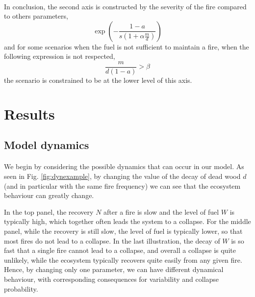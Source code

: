 \documentclass{article}
\begin{document}
\paragraph{}
In conclusion, the second axis is constructed by the severity of the fire compared to others parameters, 
\[
\exp(-\frac{1-a}{s(1+\alpha\frac{m}{d})})
\]
and for some scenarios when the fuel is not sufficient to maintain a fire, when the following expression is not respected,
\[
\frac{m}{d( 1-a)} > \beta
\]
the scenario is constrained to be at the lower level of this axis.

\newpage

\section{Results}

\subsection{Model dynamics}




\paragraph{}
We begin by considering the possible dynamics that can occur in our model. As seen in Fig. \ref{fig:dynexample}, by changing the value of the decay of dead wood $d$ (and in particular with the same fire frequency) we can see that the ecosystem behaviour can greatly change.

In the top panel, the recovery $N$ after a fire is slow and the level of fuel $W$ is typically high, which together often leads the system to a collapse. For the middle panel, while the recovery is still slow, the level of fuel is typically lower, so that most fires do not lead to a collapse. In the last illustration, the decay of $W$ is so fast that a single fire cannot lead to a collapse, and overall a collapse is quite unlikely, while the ecosystem typically recovers quite easily from any given fire. Hence, by changing only one parameter, we can have different dynamical behaviour, with corresponding consequences for variability and collapse probability.
\end{document}
